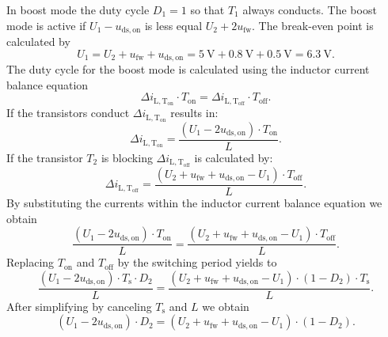 \begin{solutionblock}
    In boost mode the duty cycle $D_\mathrm{1}=1$ so that $T_\mathrm{1}$ always conducts.
    The boost mode is active if $U_\mathrm{1}-u_\mathrm{ds,on}$ is less equal $U_\mathrm{2}+2u_\mathrm{fw}$. The break-even point is calculated by
    \begin{equation*}
        U_\mathrm{1}=U_\mathrm{2}+ u_\mathrm{fw} + u_\mathrm{ds,on}=\SI{5}{\volt}+\SI{0.8}{\volt}+ \SI{0.5}{\volt}=\SI{6.3}{\volt}.
    \end{equation*}
    The duty cycle for the boost mode is calculated using the inductor current balance equation
    \begin{equation*}
        \Delta i_\mathrm{L,T_\mathrm{on}} \cdot T_\mathrm{on}=\Delta i_\mathrm{L,T_\mathrm{off}} \cdot T_\mathrm{off}.
    \end{equation*}
    If the transistors conduct $\Delta i_\mathrm{L,T_\mathrm{on}}$ results in:
    \begin{equation*}
        \Delta i_\mathrm{L,T_\mathrm{on}}=\frac{(U_\mathrm{1}-2u_\mathrm{ds,on}) \cdot T_\mathrm{on} }{L}.
    \end{equation*}
    If the transistor $T_\mathrm{2}$ is blocking $\Delta i_\mathrm{L,T_\mathrm{off}}$ is calculated by:
    \begin{equation*}
        \Delta i_\mathrm{L,T_\mathrm{off}}=\frac{(U_\mathrm{2}+ u_\mathrm{fw} + u_\mathrm{ds,on}-U_\mathrm{1} ) \cdot T_\mathrm{off}}{L}.
    \end{equation*}
    By substituting the currents within the inductor current balance equation we obtain
    \begin{equation*}
        \frac{(U_\mathrm{1}-2u_\mathrm{ds,on}) \cdot T_\mathrm{on} }{L}=\frac{(U_\mathrm{2}+ u_\mathrm{fw} + u_\mathrm{ds,on}-U_\mathrm{1} ) \cdot T_\mathrm{off}}{L}.
    \end{equation*}
    Replacing $T_\mathrm{on}$ and $T_\mathrm{off}$ by the switching period yields to
    \begin{equation*}
        \frac{(U_\mathrm{1}-2u_\mathrm{ds,on}) \cdot T_\mathrm{s} \cdot D_\mathrm{2}}{L} =
        \frac{(U_\mathrm{2}+ u_\mathrm{fw} + u_\mathrm{ds,on}-U_\mathrm{1}) \cdot (1-D_\mathrm{2}) \cdot T_\mathrm{s}}{L}.
    \end{equation*}
    After simplifying by canceling $T_\mathrm{s}$ and $L$ we obtain
    \begin{equation*}
        (U_\mathrm{1}-2u_\mathrm{ds,on}) \cdot D_\mathrm{2} =
        (U_\mathrm{2}+ u_\mathrm{fw} + u_\mathrm{ds,on}-U_\mathrm{1}) \cdot (1-D_\mathrm{2}).

\end{equation*}
\end{solutionblock}
